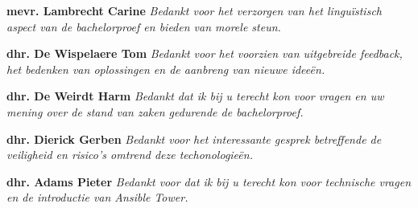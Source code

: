 \begin{center}
	
		\large{\textbf{mevr. Lambrecht Carine}}\newline
	\textit{Bedankt voor het verzorgen van het lingu\"istisch aspect van de bachelorproef en bieden van morele steun.}\newline
	
		\large{\textbf{dhr. De Wispelaere Tom}}\newline
	\textit{Bedankt voor het voorzien van uitgebreide feedback, het bedenken van oplossingen en de aanbreng van nieuwe idee\"en.}\newline
	
			\large{\textbf{dhr. De Weirdt Harm}}\newline
	\textit{Bedankt dat ik bij u terecht kon voor vragen en uw mening over de stand van zaken gedurende de bachelorproef.}\newline
	
		\large{\textbf{dhr. Dierick Gerben}}\newline
	\textit{Bedankt voor het interessante gesprek betreffende de veiligheid en risico's omtrend deze techonologie\"en.}\newline
	
		\large{\textbf{dhr. Adams Pieter}}\newline
	\textit{Bedankt voor dat ik bij u terecht kon voor technische vragen en de introductie van Ansible Tower.}\newline
	

	

	
	
	
	
		
		
\end{center}